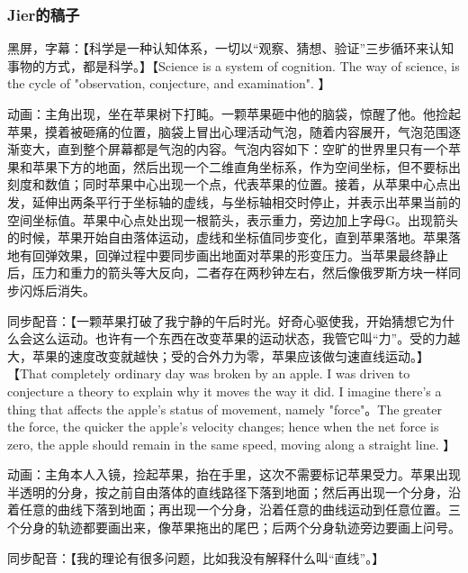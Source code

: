 
\begin{issues}
\issueDraft
\end{issues}


\subsubsection{Jier的稿子}



黑屏，字幕：【科学是一种认知体系，一切以“观察、猜想、验证”三步循环来认知事物的方式，都是科学。】【Science is a system of cognition. The way of science, is the cycle of "observation, conjecture, and examination". 】

动画：主角出现，坐在苹果树下打盹。一颗苹果砸中他的脑袋，惊醒了他。他捡起苹果，摸着被砸痛的位置，脑袋上冒出心理活动气泡，随着内容展开，气泡范围逐渐变大，直到整个屏幕都是气泡的内容。气泡内容如下：空旷的世界里只有一个苹果和苹果下方的地面，然后出现一个二维直角坐标系，作为空间坐标，但不要标出刻度和数值；同时苹果中心出现一个点，代表苹果的位置。接着，从苹果中心点出发，延伸出两条平行于坐标轴的虚线，与坐标轴相交时停止，并表示出苹果当前的空间坐标值。苹果中心点处出现一根箭头，表示重力，旁边加上字母G。出现箭头的时候，苹果开始自由落体运动，虚线和坐标值同步变化，直到苹果落地。苹果落地有回弹效果，回弹过程中要同步画出地面对苹果的形变压力。当苹果最终静止后，压力和重力的箭头等大反向，二者存在两秒钟左右，然后像俄罗斯方块一样同步闪烁后消失。

同步配音：【一颗苹果打破了我宁静的午后时光。好奇心驱使我，开始猜想它为什么会这么运动。也许有一个东西在改变苹果的运动状态，我管它叫“力”。受的力越大，苹果的速度改变就越快；受的合外力为零，苹果应该做匀速直线运动。】【That completely ordinary day was broken by an apple. I was driven to conjecture a theory to explain why it moves the way it did. I imagine there's a thing that affects the apple's status of movement, namely "force"。The greater the force, the quicker the apple's velocity changes; hence when the net force is zero, the apple should remain in the same speed, moving along a straight line. 】



动画：主角本人入镜，捡起苹果，抬在手里，这次不需要标记苹果受力。苹果出现半透明的分身，按之前自由落体的直线路径下落到地面；然后再出现一个分身，沿着任意的曲线下落到地面；再出现一个分身，沿着任意的曲线运动到任意位置。三个分身的轨迹都要画出来，像苹果拖出的尾巴；后两个分身轨迹旁边要画上问号。


同步配音：【我的理论有很多问题，比如我没有解释什么叫“直线”。】


